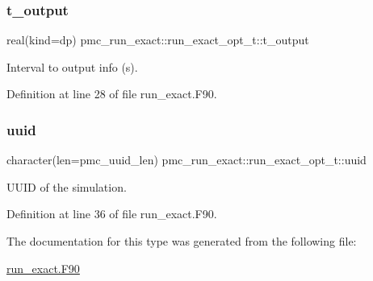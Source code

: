 \subsubsection{\texorpdfstring{t\+\_\+output}{t\_output}}
{\footnotesize\ttfamily real(kind=dp) pmc\+\_\+run\+\_\+exact\+::run\+\_\+exact\+\_\+opt\+\_\+t\+::t\+\_\+output}



Interval to output info (s). 



Definition at line 28 of file run\+\_\+exact.\+F90.

\mbox{\label{structpmc__run__exact_1_1run__exact__opt__t_a3341ca1feb0b0256620c471848fc7ec1}} 
\subsubsection{\texorpdfstring{uuid}{uuid}}
{\footnotesize\ttfamily character(len=pmc\+\_\+uuid\+\_\+len) pmc\+\_\+run\+\_\+exact\+::run\+\_\+exact\+\_\+opt\+\_\+t\+::uuid}



U\+U\+ID of the simulation. 



Definition at line 36 of file run\+\_\+exact.\+F90.



The documentation for this type was generated from the following file\+:\begin{DoxyCompactItemize}
\item 
\mbox{\hyperlink{run__exact_8_f90}{run\+\_\+exact.\+F90}}\end{DoxyCompactItemize}
